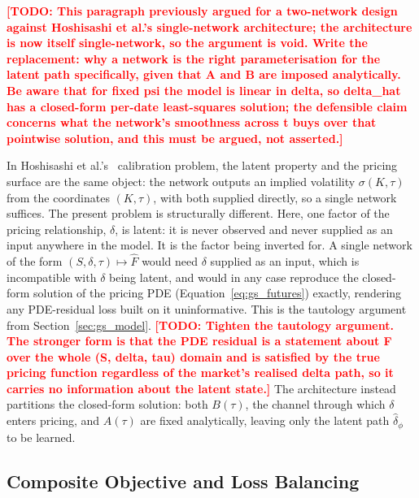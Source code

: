 \documentclass[11pt, a4paper]{article}
\newcommand{\todo}[1]{\textcolor{red}{\textbf{[TODO: #1]}}}
\begin{document}
\todo{This paragraph previously argued for a two-network design against
  Hoshisashi et al.'s single-network architecture; the architecture is now
  itself single-network, so the argument is void. Write the replacement: why a
  network is the right parameterisation for the latent path specifically, given
  that A and B are imposed analytically. Be aware that for fixed psi the model
  is linear in delta, so delta\_hat has a closed-form per-date least-squares
  solution; the defensible claim concerns what the network's smoothness across
  t buys over that pointwise solution, and this must be argued, not asserted.}

  

In Hoshisashi et al.'s~\cite{Hoshisashi2024Physics-InformedPDEs} calibration
problem, the latent property and the pricing surface are the same
object: the network outputs an implied volatility $\sigma(K,\tau)$ from
the coordinates $(K,\tau)$, with both supplied directly, so a single
network suffices. The present problem is structurally different. Here,
one factor of the pricing relationship, $\delta$, is latent: it is never
observed and never supplied as an input anywhere in the model. It is the
factor being inverted for. A single network of the form
$(S,\delta,\tau)\mapsto\hat{F}$ would need $\delta$ supplied as an input,
which is incompatible with $\delta$ being latent, and would in any case
reproduce the closed-form solution of the pricing PDE
(Equation~\ref{eq:gs_futures}) exactly, rendering any PDE-residual loss
built on it uninformative. This is the tautology argument from
Section~\ref{sec:gs_model}.
\todo{Tighten the tautology argument. The stronger form is that the PDE residual
  is a statement about F over the whole (S, delta, tau) domain and is satisfied
  by the true pricing function regardless of the market's realised delta path,
  so it carries no information about the latent state.}
The architecture instead partitions the
closed-form solution: both $B(\tau)$, the channel through which $\delta$
enters pricing, and $A(\tau)$ are fixed analytically, leaving only the latent
path $\hat{\delta}_\phi$ to be learned.




\subsection{Composite Objective and Loss Balancing}
\label{sec:multi_obj}
\end{document}
